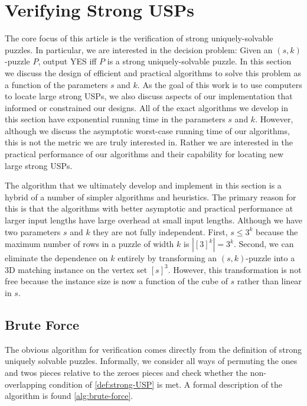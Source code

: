 \documentclass[11pt]{article}
\begin{document}
\section{Verifying Strong USPs}
\label{sec:verify}

The core focus of this article is the verification of strong
uniquely-solvable puzzles.  In particular, we are interested in the
decision problem: Given an $(s,k)$-puzzle $P$, output YES iff $P$ is a
strong uniquely-solvable puzzle.  In this section we discuss the
design of efficient and practical algorithms to solve this problem as
a function of the parameters $s$ and $k$.  As the goal of this work is
to use computers to locate large strong USPs, we also discuss aspects
of our implementation that informed or constrained our designs.  All of
the exact algorithms we develop in this section have exponential
running time in the parameters $s$ and $k$.  However, although we
discuss the asymptotic worst-case running time of our algorithms, this
is not the metric we are truly interested in.  Rather we are
interested in the practical performance of our algorithms and their
capability for locating new large strong USPs.

The algorithm that we ultimately develop and implement in this section
is a hybrid of a number of simpler algorithms and heuristics.  The
primary reason for this is that the algorithms with better asymptotic
and practical performance at larger input lengths have large overhead
at small input lengths.  Although we have two parameters $s$ and $k$
they are not fully independent.  First, $s \le 3^k$ because the
maximum number of rows in a puzzle of width $k$ is $|[3]^k| = 3^k$.
Second, we can eliminate the dependence on $k$ entirely by
transforming an $(s,k)$-puzzle into a 3D matching instance on the
vertex set $[s]^3$.  However, this transformation is not free because
the instance size is now a function of the cube of $s$ rather than
linear in $s$.

\subsection{Brute Force}

The obvious algorithm for verification comes directly from the
definition of strong uniquely solvable puzzles.  Informally, we
consider all ways of permuting the ones and twos pieces relative to
the zeroes pieces and check whether the non-overlapping condition of
\autoref{def:strong-USP} is met.  A formal description of the
algorithm is found \autoref{alg:brute-force}.
\end{document}
